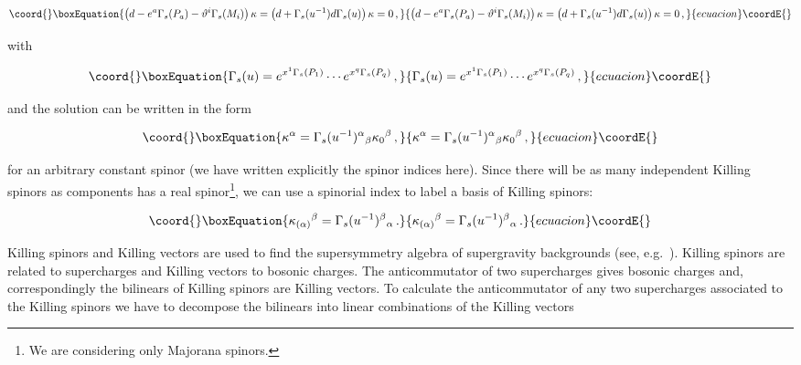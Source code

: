 \documentclass[12pt,a4paper]{article}
\begin{document}
\begin{equation}\coord{}\boxEquation{
\left(d -e^{a}\Gamma_{s}(P_{a}) -\vartheta^{i}\Gamma_{s}(M_{i}) 
\right)\kappa= 
\left(d +\Gamma_{s}(u^{-1}) d \Gamma_{s}(u) \right)\kappa =0\, ,
}{
\left(d -e^{a}\Gamma_{s}(P_{a}) -\vartheta^{i}\Gamma_{s}(M_{i}) 
\right)\kappa= 
\left(d +\Gamma_{s}(u^{-1}) d \Gamma_{s}(u) \right)\kappa =0\, ,
}{ecuacion}\coordE{}\end{equation}

\noindent
with

\begin{equation}\coord{}\boxEquation{
\Gamma_{s}(u) = 
e^{x^{1}\Gamma_{s}(P_{1})}\cdots e^{x^{q}\Gamma_{s}(P_{q})}\, ,
}{
\Gamma_{s}(u) = 
e^{x^{1}\Gamma_{s}(P_{1})}\cdots e^{x^{q}\Gamma_{s}(P_{q})}\, ,
}{ecuacion}\coordE{}\end{equation}

\noindent
and the solution can be written in the form

\begin{equation}\coord{}\boxEquation{
\kappa^{\alpha}=   \Gamma_{s}(u^{-1})^{\alpha}{}_{\beta} \kappa_{0}{}^{\beta}\, ,
}{
\kappa^{\alpha}=   \Gamma_{s}(u^{-1})^{\alpha}{}_{\beta} \kappa_{0}{}^{\beta}\, ,
}{ecuacion}\coordE{}\end{equation}

\noindent
for an arbitrary constant spinor \coordHE{} (we have
written explicitly the spinor indices here). Since there will be as
many independent Killing spinors as components has a real
spinor\footnote{We are considering only Majorana spinors.}, we can use
a spinorial index \myHighlight{$\alpha$}\coordHE{} to label a basis of Killing spinors:

\begin{equation}\coord{}\boxEquation{
\kappa_{(\alpha)}{}^{\beta}=   \Gamma_{s}(u^{-1})^{\beta}{}_{\alpha}\, .
}{
\kappa_{(\alpha)}{}^{\beta}=   \Gamma_{s}(u^{-1})^{\beta}{}_{\alpha}\, .
}{ecuacion}\coordE{}\end{equation}

Killing spinors and Killing vectors are used to find the supersymmetry
algebra of supergravity backgrounds (see,
e.g.~\cite{Gauntlett:1998fz,Figueroa-O'Farrill:1999va,Ortin:2002qb}).
Killing spinors are related to supercharges and Killing vectors to
bosonic charges. The anticommutator of two supercharges gives bosonic
charges and, correspondingly the bilinears
\coordHE{} of Killing spinors are Killing
vectors. To calculate the anticommutator of any two supercharges
\coordHE{} associated to the Killing spinors
\myHighlight{$\kappa_{(\alpha)}$}\coordHE{} we have to decompose the bilinears into linear
combinations of the Killing vectors \coordHE{}
\end{document}
